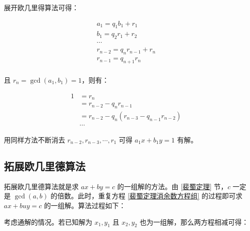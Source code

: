 \documentclass[a4paper]{article}         %
\begin{document}
展开欧几里得算法可得：

\begin{gather*}
    a_1 = q_1 b_1 + r_1 \\
    b_1 = q_2 r_1 + r_2 \\
    \cdots              \\
    r_{n-2} = q_{n} r_{n-1} + r_n\\
    r_{n-1} = q_{n+1} r_{n}\\
\end{gather*}

且 $r_n = \gcd(a_1, b_1) = 1$，则有：

\begin{equation}
    \label{裴蜀定理消余数方程组}
    \begin{aligned}
        1 & = r_n \\
        & = r_{n-2} - q_n r_{n-1} \\
        & = r_{n-2} - q_n (r_{n-3} - q_{n-1}r_{n-2}) \\
        & \cdots
    \end{aligned}
\end{equation}

用同样方法不断消去 $r_{n-2}, r_{n-3}, \cdots, r_1$ 可得 $a_1 x + b_1 y = 1$ 有解。

\subsection{拓展欧几里德算法}


拓展欧几里德算法就是求 $ax + by = c$ 的一组解的方法。由 \ref{裴蜀定理} 节，$c$ 一定是 $\gcd(a, b)$ 的倍数。此时，重复方程 \ref{裴蜀定理消余数方程组} 的过程即可求 $ax + buy = c$ 的一组解。算法过程如下：






考虑通解的情况。若已知解为 $x_1, y_1$ 且 $x_2, y_2$ 也为一组解，那么两方程相减可得：
\end{document}
